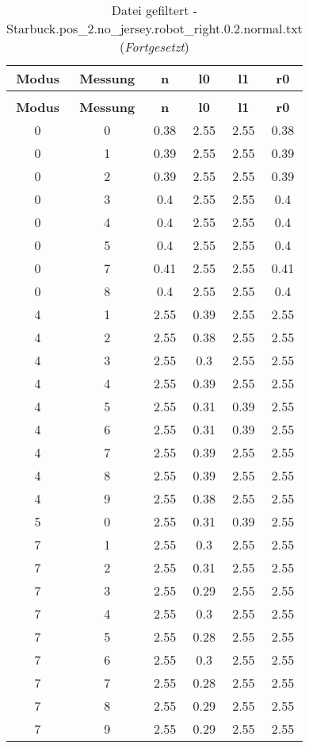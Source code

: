 \begin{longtable}{|c|c||c||c|c||c|}
	\caption{Datei gefiltert - Starbuck.pos\_2.no\_jersey.robot\_right.0.2.normal.txt} \label{tab:Starbuck.pos-2.no-jersey.robot-right.0.2.normal.txt} \\ \hline
	\textbf{Modus} & \textbf{Messung} & \textbf{n} & \textbf{l0} & \textbf{l1} & \textbf{r0}\\ \hline
	\endfirsthead
	\caption[]{Datei gefiltert - Starbuck.pos\_2.no\_jersey.robot\_right.0.2.normal.txt (\emph{Fortgesetzt})} \\ \hline
	\textbf{Modus} & \textbf{Messung} & \textbf{n} & \textbf{l0} & \textbf{l1} & \textbf{r0}\\ \hline
	\endhead
	0 & 0 & 0.38 & 2.55 & 2.55 & 0.38 \\ \hline
	0 & 1 & 0.39 & 2.55 & 2.55 & 0.39 \\ \hline
	0 & 2 & 0.39 & 2.55 & 2.55 & 0.39 \\ \hline
	0 & 3 & 0.4 & 2.55 & 2.55 & 0.4 \\ \hline
	0 & 4 & 0.4 & 2.55 & 2.55 & 0.4 \\ \hline
	0 & 5 & 0.4 & 2.55 & 2.55 & 0.4 \\ \hline
	0 & 7 & 0.41 & 2.55 & 2.55 & 0.41 \\ \hline
	0 & 8 & 0.4 & 2.55 & 2.55 & 0.4 \\ \hline
	4 & 1 & 2.55 & 0.39 & 2.55 & 2.55 \\ \hline
	4 & 2 & 2.55 & 0.38 & 2.55 & 2.55 \\ \hline
	4 & 3 & 2.55 & 0.3 & 2.55 & 2.55 \\ \hline
	4 & 4 & 2.55 & 0.39 & 2.55 & 2.55 \\ \hline
	4 & 5 & 2.55 & 0.31 & 0.39 & 2.55 \\ \hline
	4 & 6 & 2.55 & 0.31 & 0.39 & 2.55 \\ \hline
	4 & 7 & 2.55 & 0.39 & 2.55 & 2.55 \\ \hline
	4 & 8 & 2.55 & 0.39 & 2.55 & 2.55 \\ \hline
	4 & 9 & 2.55 & 0.38 & 2.55 & 2.55 \\ \hline
	5 & 0 & 2.55 & 0.31 & 0.39 & 2.55 \\ \hline
	7 & 1 & 2.55 & 0.3 & 2.55 & 2.55 \\ \hline
	7 & 2 & 2.55 & 0.31 & 2.55 & 2.55 \\ \hline
	7 & 3 & 2.55 & 0.29 & 2.55 & 2.55 \\ \hline
	7 & 4 & 2.55 & 0.3 & 2.55 & 2.55 \\ \hline
	7 & 5 & 2.55 & 0.28 & 2.55 & 2.55 \\ \hline
	7 & 6 & 2.55 & 0.3 & 2.55 & 2.55 \\ \hline
	7 & 7 & 2.55 & 0.28 & 2.55 & 2.55 \\ \hline
	7 & 8 & 2.55 & 0.29 & 2.55 & 2.55 \\ \hline
	7 & 9 & 2.55 & 0.29 & 2.55 & 2.55 \\ \hline
\end{longtable}
